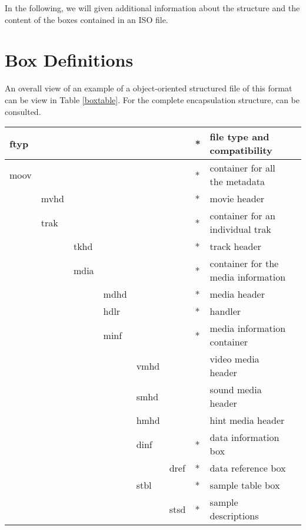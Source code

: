 In the following, we will given additional information about the structure and the content of the boxes contained in an ISO file.

\section{Box Definitions}

An overall view of an example of a object-oriented structured file of this format can be view in Table \ref{boxtable}. For the complete encapsulation structure, \cite{iso} can be consulted.

\begin{table}[]
\centering
\begin{tabular}{|l|l|l|l|l|l|l|l|l}
\hline
  ftyp &      &      &      &      &      & * & file type and compatibility\\ \hline
  moov &      &      &      &      &      & * & container for all the metadata \\ \hline
       & mvhd &      &      &      &      & * & movie header \\ \hline
       & trak &      &      &      &      & * & container for an individual trak \\ \hline
       &      & tkhd &      &      &      & * & track header\\ \hline
       &      & mdia &      &      &      & * & container for the media information \\ \hline
       &      &      & mdhd &      &      & * & media header \\ \hline
       &      &      & hdlr &      &      & * & handler \\ \hline
       &      &      & minf &      &      & * & media information container \\ \hline
       &      &      &      & vmhd &      &   & video media header \\ \hline
       &      &      &      & smhd &      &   & sound media header \\ \hline
       &      &      &      & hmhd &      &   & hint media header \\ \hline
       &      &      &      & dinf &      & * & data information box \\ \hline
       &      &      &      &      & dref & * & data reference box \\ \hline
       &      &      &      & stbl &      & * & sample table box \\ \hline
       &      &      &      &      & stsd & * & sample descriptions \\ \hline

\end{tabular}
\end{table}

